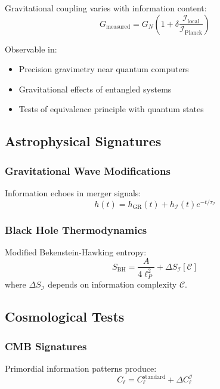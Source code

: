 \documentclass[11pt,a4paper]{article}
\theoremstyle{definition}
\begin{document}
Gravitational coupling varies with information content:
\begin{equation}
G_{\text{measured}} = G_N\left(1 + \delta\frac{\mathcal{I}_{\text{local}}}{\mathcal{I}_{\text{Planck}}}\right)
\end{equation}

Observable in:
\begin{itemize}
\item Precision gravimetry near quantum computers
\item Gravitational effects of entangled systems
\item Tests of equivalence principle with quantum states
\end{itemize}

\subsection{Astrophysical Signatures}

\subsubsection{Gravitational Wave Modifications}

Information echoes in merger signals:
\begin{equation}
h(t) = h_{\text{GR}}(t) + h_{\mathcal{I}}(t)e^{-t/\tau_{\mathcal{I}}}
\end{equation}

\subsubsection{Black Hole Thermodynamics}

Modified Bekenstein-Hawking entropy:
\begin{equation}
S_{\text{BH}} = \frac{A}{4\ell_P^2} + \Delta S_{\mathcal{I}}[\mathcal{C}]
\end{equation}
where $\Delta S_{\mathcal{I}}$ depends on information complexity $\mathcal{C}$.

\subsection{Cosmological Tests}

\subsubsection{CMB Signatures}

Primordial information patterns produce:
\begin{equation}
C_\ell = C_\ell^{\text{standard}} + \Delta C_\ell^{\mathcal{I}}
\end{equation}
\end{document}
